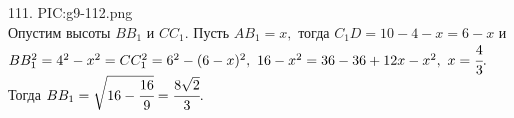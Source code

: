 111. {{PIC:g9-112.png}}\\
Опустим высоты $BB_1$ и $CC_1.$ Пусть $AB_1=x,$ тогда $C_1D=10-4-x=6-x$ и $BB_1^2=4^2-x^2=CC_1^2=6^2-(6-x)^2,\ 16-x^2=36-36+12x-x^2,\ x=\cfrac{4}{3}.$ Тогда $BB_1=\sqrt{16-\cfrac{16}{9}}=\cfrac{8\sqrt{2}}{3}.$\\
